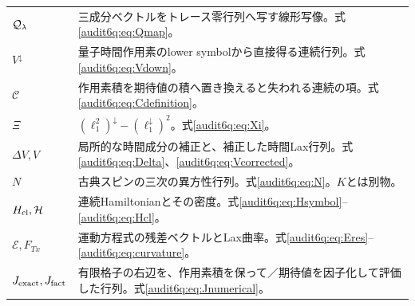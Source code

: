 \begin{longtable}{L{26mm}L{103mm}}
$\mathcal Q_{\lambda}$&三成分ベクトルをトレース零行列へ写す線形写像。式\eqref{audit6q:eq:Qmap}。\\
$V^\downarrow$&量子時間作用素のlower symbolから直接得る連続行列。式\eqref{audit6q:eq:Vdown}。\\
$\mathcal C$&作用素積を期待値の積へ置き換えると失われる連続の項。式\eqref{audit6q:eq:Cdefinition}。\\
$\Xi$&$(\ell_1^2)^\downarrow-(\ell_1^\downarrow)^2$。式\eqref{audit6q:eq:Xi}。\\
$\Delta V,V$&局所的な時間成分の補正と、補正した時間Lax行列。式\eqref{audit6q:eq:Delta}、\eqref{audit6q:eq:Vcorrected}。\\
$N$&古典スピンの三次の異方性行列。式\eqref{audit6q:eq:N}。$K$とは別物。\\
$H_{\rm cl},\mathcal H$&連続Hamiltonianとその密度。式\eqref{audit6q:eq:Hsymbol}--\eqref{audit6q:eq:Hcl}。\\
$\boldsymbol{\mathcal E},F_{Tx}$&運動方程式の残差ベクトルとLax曲率。式\eqref{audit6q:eq:Eres}--\eqref{audit6q:eq:curvature}。\\
$J_{\rm exact},J_{\rm fact}$&有限格子の右辺を、作用素積を保って／期待値を因子化して評価した行列。式\eqref{audit6q:eq:Jnumerical}。\\
\end{longtable}
\normalsize

\clearpage
